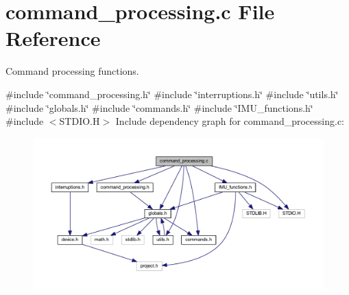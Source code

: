\section{command\+\_\+processing.\+c File Reference}
\label{command__processing_8c}


Command processing functions.  


{\ttfamily \#include \char`\"{}command\+\_\+processing.\+h\char`\"{}}\newline
{\ttfamily \#include \char`\"{}interruptions.\+h\char`\"{}}\newline
{\ttfamily \#include \char`\"{}utils.\+h\char`\"{}}\newline
{\ttfamily \#include \char`\"{}globals.\+h\char`\"{}}\newline
{\ttfamily \#include \char`\"{}commands.\+h\char`\"{}}\newline
{\ttfamily \#include \char`\"{}I\+M\+U\+\_\+functions.\+h\char`\"{}}\newline
{\ttfamily \#include $<$S\+T\+D\+I\+O.\+H$>$}\newline
Include dependency graph for command\+\_\+processing.\+c\+:
\nopagebreak
\begin{figure}[H]
\begin{center}
\leavevmode
\includegraphics[width=350pt]{command__processing_8c__incl}
\end{center}
\end{figure}
